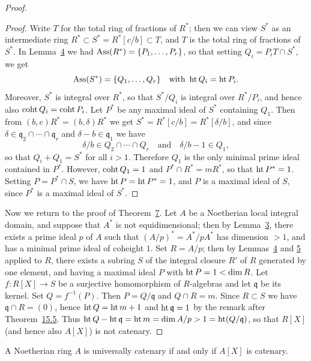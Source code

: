\begin{proof}
\begin{proof}
Write $T$ for the total ring of fractions of $R^*$; then we can view $S^*$ as an
intermediate ring $R^* \subset S^* = R^*[c/b] \subset T$, and $T$ is the total ring of
fractions of $S^*$. In Lemma~\hyperref[lem:31.4]{4} we had $\operatorname{Ass}(R^*) = \{P_1, \ldots, P_r\}$, so that
setting $Q_i = P_iT \cap S^*$, we get
\[
  \operatorname{Ass}(S^*) = \{Q_1, \ldots, Q_r\} \quad \text{with } \operatorname{ht} Q_i = \operatorname{ht} P_i.
\]
Moreover, $S^*$ is integral over $R^*$, so that $S^*/Q_i$ is integral over $R^*/P_i$, and
hence also $\operatorname{coht} Q_i = \operatorname{coht} P_i$. Let $P^*$ be any maximal ideal of $S^*$ containing
$Q_1$. Then from $(b, c)R^* = (b, \delta)R^*$ we get $S^* = R^*[c/b] = R^*[\delta/b]$, and since
$\delta \in \mathfrak{q}_2 \cap \cdots \cap \mathfrak{q}_r$ and $\delta - b \in \mathfrak{q}_1$ we have
\[
  \delta/b \in Q_2 \cap \cdots \cap Q_r \quad \text{and} \quad \delta/b - 1 \in Q_1,
\]
so that $Q_i + Q_1 = S^*$ for all $i > 1$. Therefore $Q_1$ is the only minimal prime ideal
contained in $P^*$. However, $\operatorname{coht} Q_1 = 1$ and $P^* \cap R^* = mR^*$, so that
$\operatorname{ht} P^* = 1$. Setting $P = P^* \cap S$, we have $\operatorname{ht} P = \operatorname{ht} P^* = 1$, and $P$ is a maximal
ideal of $S$, since $P^*$ is a maximal ideal of $S^*$.
\end{proof}

Now we return to the proof of Theorem~\hyperref[thm:31.7]{7}. Let $A$ be a Noetherian local
integral domain, and suppose that $A^*$ is not equidimensional; then by
Lemma~\hyperref[lem:31.3]{3}, there exists a prime ideal $p$ of $A$ such that $(A/p)^* = A^*/pA^*$
has dimension $> 1$, and has a minimal prime ideal of coheight $1$. Set $R = A/p$;
then by Lemmas~\hyperref[lem:31.4]{4} and \hyperref[lem:31.5]{5} applied to $R$, there exists a subring $S$ of the
integral closure $R'$ of $R$ generated by one element, and having a maximal ideal
$P$ with $\operatorname{ht} P = 1 < \dim R$. Let $f\colon R[X] \to S$ be a surjective homomorphism of
$R$-algebras and let $\mathfrak{q}$ be its kernel. Set $Q = f^{-1}(P)$. Then $P = Q/\mathfrak{q}$ and
$Q \cap R = m$. Since $R \subset S$ we have $\mathfrak{q} \cap R = (0)$, hence
$\operatorname{ht} Q = \operatorname{ht} m + 1$ and $\operatorname{ht} \mathfrak{q} = 1$ by the remark after
Theorem~\hyperref[thm:15.5]{15.5}. Thus $\operatorname{ht} Q - \operatorname{ht} \mathfrak{q} = \operatorname{ht} m = \dim A/p > 1 = \operatorname{ht}(Q/\mathfrak{q})$,
so that $R[X]$ (and hence also $A[X]$) is not catenary.
\end{proof}

\begin{corollary*}
A Noetherian ring $A$ is universally catenary if and only if $A[X]$ is catenary.
\end{corollary*}

